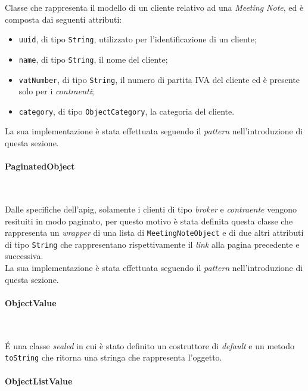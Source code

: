 \noindent Classe che rappresenta il modello di un \gls{cliente} relativo ad una \emph{Meeting Note}, ed è composta dai seguenti attributi:
\begin{itemize}
    \item \lstinline{uuid}, di tipo \lstinline{String}, utilizzato per l'identificazione di un \gls{cliente};
    \item \lstinline{name}, di tipo \lstinline{String}, il nome del \gls{cliente};
    \item \lstinline{vatNumber}, di tipo \lstinline{String}, il numero di partita IVA del \gls{cliente} ed è presente solo per i \emph{contraenti};
    \item \lstinline{category}, di tipo \lstinline{ObjectCategory}, la categoria del \gls{cliente}.
\end{itemize}
La sua implementazione è stata effettuata seguendo il \emph{pattern} nell'introduzione di questa sezione.

\paragraph*{PaginatedObject} ~ \\
\label{par:paginated-object}

\noindent Dalle specifiche dell'\gls{apig}\glsoccur, solamente i clienti di tipo \emph{broker} e \emph{contraente} vengono resituiti in modo paginato, per questo motivo è stata definita questa classe che rappresenta un \emph{wrapper} di una lista di \lstinline{MeetingNoteObject} e di due altri attributi di tipo \lstinline{String} che rappresentano rispettivamente il \emph{link} alla pagina precedente e successiva.\\
La sua implementazione è stata effettuata seguendo il \emph{pattern} nell'introduzione di questa sezione.

\paragraph*{ObjectValue} ~ \\
\label{par:object-value}

\noindent É una classe \emph{sealed}\cite{site:sealed-class} in cui è stato definito un costruttore di \emph{default} e un metodo \lstinline{toString} che ritorna una stringa che rappresenta l'oggetto.\\

\paragraph*{ObjectListValue} ~ \\
\label{par:object-list-value}

